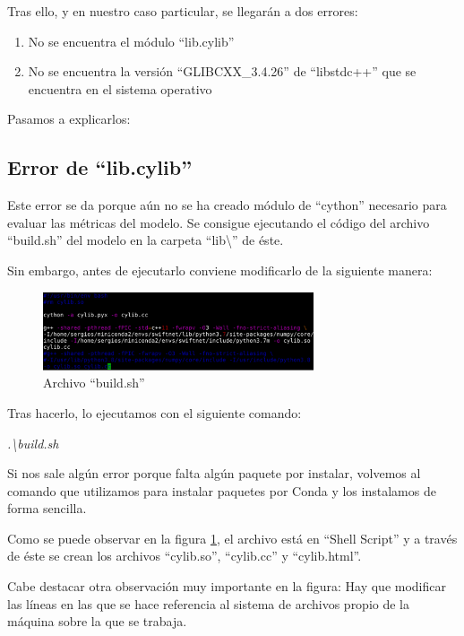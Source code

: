 Tras ello, y en nuestro caso particular, se llegarán a dos errores:

\begin{enumerate}
\item No se encuentra el módulo ``lib.cylib''
\item No se encuentra la versión ``GLIBCXX\_3.4.26'' de ``libstdc++'' que se encuentra en el sistema operativo
\end{enumerate}

Pasamos a explicarlos:

\subsection{Error de ``lib.cylib''}

Este error se da porque aún no se ha creado módulo de ``cython'' \cite{cython} necesario para evaluar las métricas del modelo. Se consigue ejecutando el código del archivo ``build.sh'' del modelo en la carpeta ``lib\textbackslash{}'' de éste.

Sin embargo, antes de ejecutarlo conviene modificarlo de la siguiente manera:

\begin{figure}[H]
  \centering
  \includegraphics[width=8cm]{Figuras/cylib.eps}
  \caption{Archivo ``build.sh''}
  \label{fig:cylib}
\end{figure}

Tras hacerlo, lo ejecutamos con el siguiente comando:

\begin{center}
\textit{.\textbackslash{build.sh}}
\end{center}

Si nos sale algún error porque falta algún paquete por instalar, volvemos al comando que utilizamos para instalar paquetes por Conda y los instalamos de forma sencilla.

Como se puede observar en la figura \ref{fig:cylib}, el archivo está en ``Shell Script'' \cite{shell} y a través de éste se crean los archivos ``cylib.so'', ``cylib.cc'' y ``cylib.html''.

Cabe destacar otra observación muy importante en la figura: Hay que modificar las líneas en las que se hace referencia al sistema de archivos propio de la máquina sobre la que se trabaja.

